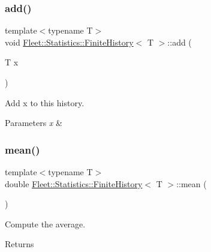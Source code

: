 \subsubsection{\texorpdfstring{add()}{add()}}
{\footnotesize\ttfamily template$<$typename T$>$ \\
void \hyperlink{class_fleet_1_1_statistics_1_1_finite_history}{Fleet\+::\+Statistics\+::\+Finite\+History}$<$ T $>$\+::add (\begin{DoxyParamCaption}\item[{T}]{x }\end{DoxyParamCaption})\hspace{0.3cm}{\ttfamily [inline]}}



Add x to this history. 


\begin{DoxyParams}{Parameters}
{\em x} & \\
\hline
\end{DoxyParams}
\mbox{\label{class_fleet_1_1_statistics_1_1_finite_history_a7ece3121889428a4082fbe88fdacc106}} 
\subsubsection{\texorpdfstring{mean()}{mean()}}
{\footnotesize\ttfamily template$<$typename T$>$ \\
double \hyperlink{class_fleet_1_1_statistics_1_1_finite_history}{Fleet\+::\+Statistics\+::\+Finite\+History}$<$ T $>$\+::mean (\begin{DoxyParamCaption}{ }\end{DoxyParamCaption})\hspace{0.3cm}{\ttfamily [inline]}}



Compute the average. 

\begin{DoxyReturn}{Returns}

\end{DoxyReturn}
\mbox{\label{class_fleet_1_1_statistics_1_1_finite_history_acee6a049c14cb100dca992444b84d9ec}} 
